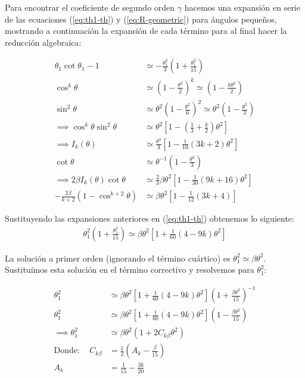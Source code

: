Para encontrar el coeficiente de segundo orden $\gamma$ hacemos una expansión en serie de las ecuaciones (\ref{eq:th1-th}) y
(\ref{eq:R-geometric}) para ángulos pequeños, mostrando a continuación la expansión de cada término para al final hacer la
reducción algebraica:

\begin{align}
  \theta_1\cot\theta_1 -1 &\simeq -\frac{\theta^2_1}{3}\left(1 + \frac{\theta^2_1}{15}\right) \\
  \cos^k\theta &\simeq \left(1 - \frac{\theta^2}{2}\right)^k \simeq \left(1 - \frac{k\theta^2}{2}\right) \\
  \sin^2\theta &\simeq \theta^2\left(1 - \frac{\theta^2}{6}\right)^2 \simeq \theta^2\left(1 - \frac{\theta^2}{3}\right)\\
  \implies \cos^k\theta\sin^2\theta &\simeq \theta^2\left[1 - \left(\frac{1}{3} + \frac{k}{2}\right)\theta^2\right] \\
  \implies I_k(\theta) &\simeq \frac{\theta^3}{3}\left[1 - \frac{1}{10}\left(3k + 2\right)\theta^2\right] \\
  \cot\theta &\simeq \theta^{-1}\left(1 - \frac{\theta^2}{3}\right) \\
  \implies 2\beta I_k(\theta)\cot\theta &\simeq \frac{2}{3}\beta\theta^2\left[1 - \frac{1}{30}\left(9k + 16\right)\theta^2\right] \\
  -\frac{2\beta}{k+2}\left(1 - \cos^{k+2}\theta\right) &\simeq \beta\theta^2\left[1 - \frac{1}{12}\left(3k+4\right)\right]
\end{align}

Sustituyendo las expansiones anteriores en (\ref{eq:th1-th}) obtenemos lo siguiente:
\begin{align}
  \theta^2_1\left(1 + \frac{\theta^2_1}{15}\right) \simeq \beta\theta^2\left[1 + \frac{1}{60}\left(4 - 9k\right)\theta^2\right]
  \label{eq:th1-th-approx}
\end{align}

La solución a primer orden (ignorando el término cuártico) es $\theta^2_ 1 \simeq \beta\theta^2$. Sustituímos esta solución en el
término correctivo y resolvemos para $\theta^2_1$:

\begin{align}
  \theta^2_1 &\simeq \beta\theta^2\left[1 + \frac{1}{60}\left(4 - 9k\right)\theta^2\right]\left(1 + \frac{\beta\theta^2}{15}\right)^{-1} \\
  \theta^2_1 &\simeq \beta\theta^2\left[1 + \frac{1}{60}\left(4 - 9k\right)\theta^2\right]\left(1 - \frac{\beta\theta^2}{15}\right) \\
  \implies \theta^2_1 &\simeq \beta\theta^2\left(1 + 2C_{k\beta}\theta^2\right) \\
  \mathrm{Donde:\quad}C_{k\beta} &= \frac{1}{2}\left(A_k - \frac{\beta}{15}\right) \\
  A_k &= \frac{1}{15} - \frac{3k}{20}
\end{align}

